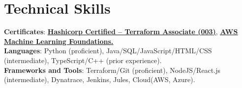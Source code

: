 \documentclass[letterpaper,10.5pt]{article}
\begin{document}
\section{Technical Skills}
 \begin{itemize}[leftmargin=0.0in, label={}]
    \small{\item{
     \textbf{Certificates}{: \underline{\href{https://www.credly.com/badges/52b619d0-9304-4a6f-bc22-3f05b057113c/linked_in_profile}{\textbf{Hashicorp Certified – Terraform Associate (003)}}}, \underline{\href{https://www.linkedin.com/posts/ayazhankad_aws-machine-learning-foundations-2022-activity-7001448530271772672-53pA?utm_source=share&utm_medium=member_desktop}{\textbf{AWS Machine Learning Foundations.}}}} \\
     \textbf{Languages}{: Python (proficient), Java/SQL/JavaScript/HTML/CSS (intermediate), TypeScript/C++ (prior experience).} \\
     \textbf{Frameworks and Tools}{: Terraform/Git (proficient), NodeJS/React.js (intermediate), Dynatrace, Jenkins, Jules, Cloud(AWS, Azure).}}}
 \end{itemize}
\end{document}
